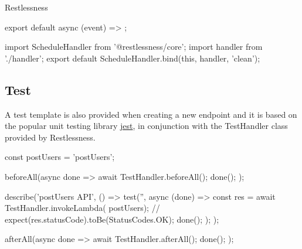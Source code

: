 \begin{chapter}{Restlessness}
    \bigskip
    \begin{code}[caption=handler.ts content, label={lst:sched_handler_ts}]
export default async (event) => {};
    \end{code}

    \bigskip
    \begin{code}[caption=index.ts content, label={lst:sched_index_ts}]
import { ScheduleHandler } from '@restlessness/core';
import handler from './handler';
export default ScheduleHandler.bind(this, handler, 'clean');
    \end{code}

    \subsection{Test}
    A test template is also provided when creating a new endpoint and it is based
    on the popular unit testing library \href{https://jestjs.io/}{jest}, in
    conjunction with the TestHandler class provided by Restlessness.

    \bigskip
    \begin{code}[caption=index.test.ts template, label={lst:endopints_test_ts}]
const postUsers = 'postUsers';

beforeAll(async done => {
  await TestHandler.beforeAll();
  done();
});

describe('postUsers API', () => {
  test('', async (done) => {
    const res = await TestHandler.invokeLambda(
        postUsers);
    // expect(res.statusCode).toBe(StatusCodes.OK);
    done();
  });
});

afterAll(async done => {
  await TestHandler.afterAll();
  done();
});
    \end{code}

\end{chapter}